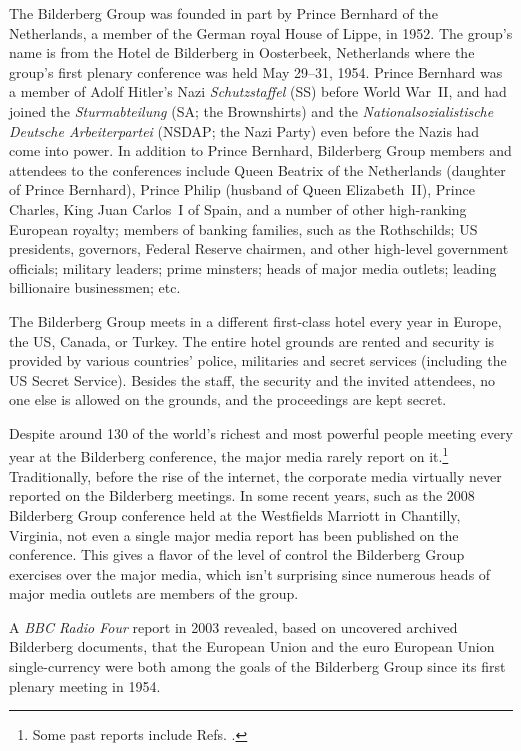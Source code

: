 \documentclass[letterpaper,12pt]{article}
\begin{document}
The Bilderberg Group was founded in part by Prince Bernhard of the Netherlands, a member of the German royal House of Lippe, in 1952. The group's name is from the Hotel de Bilderberg in Oosterbeek, Netherlands where the group's first plenary conference was held May 29--31, 1954. Prince Bernhard was a member of Adolf Hitler's Nazi \emph{Schutzstaffel} (SS) before World War~II, and had joined the \emph{Sturmabteilung} (SA; the Brownshirts) and the \emph{Nationalsozialistische Deutsche Arbeiterpartei} (NSDAP; the Nazi Party) even before the Nazis had come into power. In addition to Prince Bernhard, Bilderberg Group members and attendees to the conferences include Queen Beatrix of the Netherlands (daughter of Prince Bernhard), Prince Philip (husband of Queen Elizabeth~II), Prince Charles, King Juan Carlos~I of Spain, and a number of other high-ranking European royalty; members of banking families, such as the Rothschilds; US presidents, governors, Federal Reserve chairmen, and other high-level government officials; military leaders; prime minsters; heads of major media outlets; leading billionaire businessmen; etc.

The Bilderberg Group meets in a different first-class hotel every year in Europe, the US, Canada, or Turkey. The entire hotel grounds are rented and security is provided by various countries' police, militaries and secret services (including the US Secret Service). Besides the staff, the security and the invited attendees, no one else is allowed on the grounds, and the proceedings are kept secret.

Despite around 130 of the world's richest and most powerful people meeting every year at the Bilderberg conference, the major media rarely report on it.\footnote{Some past reports include Refs. .} Traditionally, before the rise of the internet, the corporate media virtually never reported on the Bilderberg meetings. In some recent years, such as the 2008 Bilderberg Group conference held at the Westfields Marriott in Chantilly, Virginia, not even a single major media report has been published on the conference. This gives a flavor of the level of control the Bilderberg Group exercises over the major media, which isn't surprising since numerous heads of major media outlets are members of the group.

A \emph{BBC Radio Four} report in 2003 \cite{Cox2003} revealed, based on uncovered archived Bilderberg documents, that the European Union and the euro European Union single-currency were both among the goals of the Bilderberg Group since its first plenary meeting in 1954.
\end{document}
